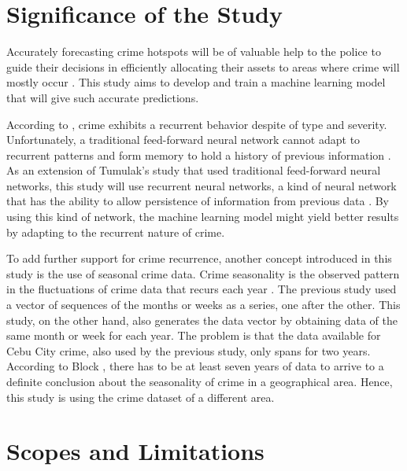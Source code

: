 \section{Significance of the Study}

    Accurately forecasting crime hotspots will be of valuable help to the police to guide their decisions in efficiently allocating their assets to areas where crime will mostly occur \citep{eck2005mapping}. This study aims to develop and train a machine learning model that will give such accurate predictions.

    According to \citet{perc2013understanding}, crime exhibits a recurrent behavior despite of type and severity. Unfortunately, a traditional feed-forward neural network cannot adapt to recurrent patterns and form memory to hold a history of previous information \citep{mikolov2010recurrent}. As an extension of Tumulak's study \citeyearpar{tumulak2015crime} that used traditional feed-forward neural networks, this study will use recurrent neural networks, a kind of neural network that has the ability to allow persistence of information from previous data \citep{graves2012supervised}. By using this kind of network, the machine learning model might yield better results by adapting to the recurrent nature of crime.

    To add further support for crime recurrence, another concept introduced in this study is the use of seasonal crime data. Crime seasonality is the observed pattern in the fluctuations of crime data that recurs each year \citep{lauritsen2014seasonal}. The previous study used a vector of sequences of the months or weeks as a series, one after the other. This study, on the other hand, also generates the data vector by obtaining data of the same month or week for each year. The problem is that the data available for Cebu City crime, also used by the previous study, only spans for two years. According to Block \citeyearpar{block1984crime}, there has to be at least seven years of data to arrive to a definite conclusion about the seasonality of crime in a geographical area. Hence, this study is using the crime dataset of a different area.

\section{Scopes and Limitations}

